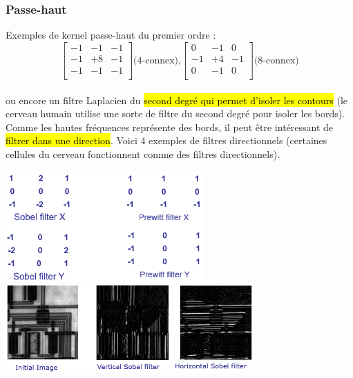 \documentclass[letterpaper, 12pt]{article}
\newcommand{\alinea}{
\hspace*{0.5cm}}
\begin{document}
		\subsubsection{Passe-haut}
			\alinea Exemples de kernel passe-haut du premier ordre : \\
			$$\begin{bmatrix} -1&-1&-1\\ -1&+8&-1\\-1&-1&-1\\ \end{bmatrix} \text{(4-connex),} 
			\begin{bmatrix} 0&-1&0\\ -1&+4&-1\\0&-1&0\\ \end{bmatrix} \text{(8-connex)}$$\\ ou encore un filtre Laplacien du
			\hl{second degré qui permet d'isoler les contours} (le cerveau humain utilise une sorte de filtre du second degré pour
			isoler les bords). Comme les hautes fréquences représente des bords, il peut être 
			intéressant de \hl{filtrer dans une	direction}. Voici 4 exemples de filtres directionnels (certaines cellules du cerveau
			fonctionnent comme des filtres directionnels).
			\begin{center}
				\includegraphics[width=3in]{Images/directional} \hfill \includegraphics[width=3.75in]{Images/directional2}
			\end{center}
\end{document}
